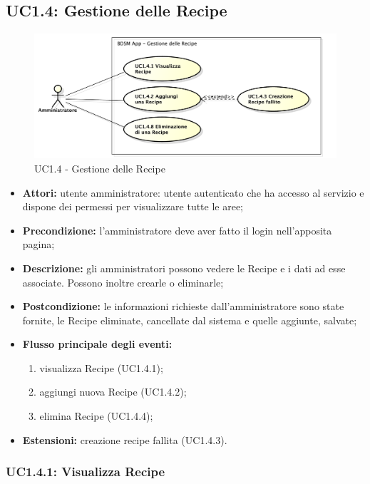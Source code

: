 \pagebreak


\subsection{UC1.4: Gestione delle Recipe}

\begin{figure}[!ht]
    \centering
    \centerline{\includegraphics[scale=0.5]{./images/UC1_4.pdf}}
    \caption{UC1.4 - Gestione delle Recipe}
\end{figure}

\begin{itemize}
    \item \textbf{Attori:} utente amministratore: utente autenticato che ha accesso al servizio e dispone dei permessi per visualizzare tutte le aree;
    \item \textbf{Precondizione:} l'amministratore deve aver fatto il login nell'apposita pagina;
    \item \textbf{Descrizione:} gli amministratori possono vedere le Recipe e i dati ad esse associate. Possono inoltre crearle o eliminarle;
    \item \textbf{Postcondizione:} le informazioni richieste dall'amministratore sono state fornite, le Recipe eliminate, cancellate dal sistema e quelle aggiunte, salvate;
    \item \textbf{Flusso principale degli eventi:}
    \begin{enumerate}
        \item visualizza Recipe (UC1.4.1);
        \item aggiungi nuova Recipe (UC1.4.2);
        \item elimina Recipe (UC1.4.4);
    \end{enumerate}
    \item \textbf{Estensioni:} creazione recipe fallita (UC1.4.3).
\end{itemize}

\subsubsection{UC1.4.1: Visualizza Recipe}

